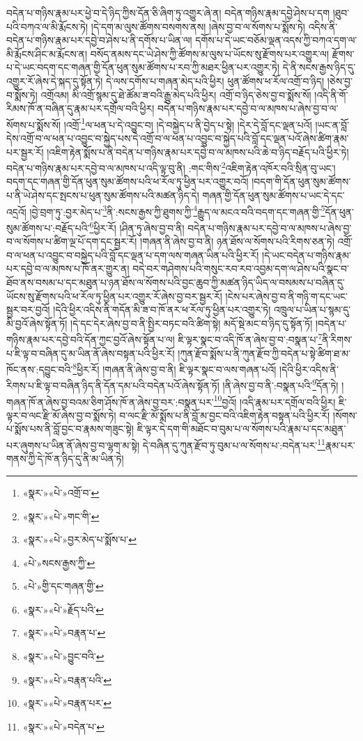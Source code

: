 བདེན་པ་གཉིས་རྣམ་པར་ཕྱེ་བ་དེ་ཉིད་ཀྱིས་དོན་ཅི་ཞིག་ཏུ་འགྱུར་ཞེ་ན། བདེན་གཉིས་རྣམ་དབྱེ་ཤེས་པ་དག །ཐུབ་པའི་བཀའ་ལ་མི་རྨོངས་ཏེ། །དེ་དག་མ་ལུས་ཚོགས་བསགས་ནས། །ཞེས་བྱ་བ་ལ་སོགས་པ་སྨོས་ཏེ། འདིས་ནི་བདེན་པ་གཉིས་རྣམ་པར་དབྱེ་བ་ཤེས་པ་ནི་དགོས་པ་ཡིན་ལ། དགོས་པ་དེ་ཡང་བཅོམ་ལྡན་འདས་ཀྱི་བཀའ་དག་ལ་མི་རྨོངས་ཤིང་མ་རྨོངས་ན། བསོད་ནམས་དང་ཡེ་ཤེས་ཀྱི་ཚོགས་མ་ལུས་པ་ཡོངས་སུ་རྫོགས་པར་འགྱུར་ལ། རྫོགས་པ་དེ་ཡང་བདག་དང་གཞན་གྱི་དོན་ཕུན་སུམ་ཚོགས་པ་རབ་ཀྱི་མཐར་ཕྱིན་པར་འགྱུར་ཏེ། དེ་ནི་སངས་རྒྱས་ཉིད་དུ་འགྱུར་རོ་ཞེས་དེ་སྐད་དུ་སྟོན་ཏེ། དེ་ལས་དགོས་པ་གཞན་མེད་པའི་ཕྱིར། ཕུན་ཚོགས་ཕ་རོལ་འགྲོ་བ་ཉིད། །ཅེས་བྱ་བ་སྨོས་ཏེ། འགྲོའམ། མི་འགྲོ་སྙམ་དུ་ཐེ་ཚོམ་ཟ་བའི་རྒྱུ་མེད་པའི་ཕྱིར། འགྲོ་བ་ཉིད་ཅེས་བྱ་བ་སྨོས་སོ། །འདི་ནི་གོ་རིམས་ཁོ་ན་བཞིན་དུ་རྣམ་པར་དགྲོལ་བའི་ཕྱིར། བདེན་པ་གཉིས་རྣམ་པར་དབྱེ་བ་ལ་མཁས་པ་ཞེས་བྱ་བ་ལ་སོགས་པ་སྨོས་སོ། །འགྲོ་\footnote{«སྣར་»«པེ་»འགྲོ་བ་}ལ་ཕན་པ་དེ་འབྱུང་བ། །དེ་བསྐྱེད་པ་ནི་བྱེད་པ་སྟེ། །དེར་དེ་བློ་དང་ལྡན་པའོ། །ཡང་ན་བློ་དེས་འགྲོ་བ་ལ་ཕན་པ་འབྱུང་བ་སྐྱེད་པས་དེ་འགྲོ་བ་ལ་ཕན་པ་འབྱུང་བ་སྐྱེད་པའི་བློ་དང་ལྡན་པའོ་ཞེས་ཚིག་རྣམ་པར་སྦྱར་རོ། །འཇིག་རྟེན་སྨོས་པ་ནི་བདེན་པ་གཉིས་རྣམ་པར་དབྱེ་བ་ལ་མཁས་པའི་ཆེ་བ་ཉིད་བརྗོད་པའི་ཕྱིར་ཏེ། བདེན་པ་གཉིས་རྣམ་པར་དབྱེ་བ་ལ་མཁས་པ་འདི་ལྟ་བུ་ནི། :གང་གིས་\footnote{«སྣར་»«པེ་»གང་གི་}འཇིག་རྟེན་འཁོར་བའི་སྲིན་བུ་ཡང་། བདག་དང་གཞན་གྱི་དོན་ཕུན་སུམ་ཚོགས་པའི་ཕ་རོལ་ཏུ་ཕྱིན་པར་འགྱུར་བའོ། །བདག་གི་དོན་ཕུན་སུམ་ཚོགས་པ་ནི་ཡེ་ཤེས་དང་སྤངས་པ་ཕུན་སུམ་ཚོགས་པའི་མཚན་ཉིད་དེ། གཞན་གྱི་དོན་ཕུན་སུམ་ཚོགས་པ་ཡང་དེ་དང་འདྲའོ། །བྱེ་བྲག་ཏུ་:བྱར་མེད་པ་\footnote{«སྣར་»«པེ་»བྱར་མེད་པ་སྨོས་པ་}ནི་:སངས་རྒྱས་ཀྱི་ཐུགས་ཀྱི་\footnote{«པེ་»སངས་རྒྱས་ཀྱི་}རྒྱུད་ལ་མངའ་བའི་བདག་དང་གཞན་གྱི་\footnote{«པེ་»གྱི་དང་གཞན་གྱི་}དོན་ཕུན་སུམ་ཚོགས་པ་:བརྗོད་པའི་\footnote{«སྣར་»«པེ་»རྗོད་པའི་}ཕྱིར་རོ། །ཤིན་ཏུ་ཞེས་བྱ་བ་ནི། བདེན་པ་གཉིས་རྣམ་པར་དབྱེ་བ་ལ་མཁས་པ་ཞེས་བྱ་བ་ལ་སོགས་པ་ཚིག་ལྔ་པོ་དག་དང་སྦྱར་རོ། །གཞན་ནི་ཞེས་བྱ་བ་ནི། ཉན་ཐོས་ལ་སོགས་པའི་རིགས་ཅན་ཏེ། འགྲོ་བ་ལ་ཕན་པ་འབྱུང་བ་བསྐྱེད་པའི་བློ་དང་ལྡན་པ་དག་ལས་གཞན་ཡིན་པའི་ཕྱིར་རོ། །དེ་ཡང་བདེན་པ་གཉིས་རྣམ་པར་དབྱེ་བ་ལ་མཁས་པ་ཁོ་ནར་གྱུར་ན། བདེ་བར་གཤེགས་པའི་གསུང་རབ་རབ་འབྱམ་དག་ལ་ཤེས་པའི་སྣང་བ་ཐོབ་ནས་བསམ་པ་དང་མཐུན་པ་ཉན་ཐོས་ལ་སོགས་པའི་བྱང་ཆུབ་ཀྱི་མཚན་ཉིད་ཡིད་ལ་བསམས་པ་བཞིན་དུ་ཡོངས་སུ་རྫོགས་པའི་ཕ་རོལ་ཏུ་ཕྱིན་པར་འགྱུར་རོ་ཞེས་བྱ་བར་སྦྱར་རོ། །ངེས་པར་ཞེས་བྱ་བ་ནི་གཉི་ག་དང་ཡང་སྦྱར་བར་བྱའོ། །དེའི་ཕྱིར་འདིས་ནི་གདོན་མི་ཟ་བ་ཁོ་ནར་ཕ་རོལ་ཏུ་ཕྱིན་པར་འགྱུར་ཏེ། འཁྲུལ་པ་ཡིན་པ་སྙམ་དུ་མི་བྱའོ་ཞེས་སྟོན་ཏོ། །དེ་དང་དེར་ཞེས་བྱ་བ་ནི་སྤྱིར་བཏང་བའི་ཚིག་སྟེ། མདོ་སྡེ་མང་བ་ཉིད་དུ་སྟོན་ཏོ། །བདེན་པ་གཉིས་རྣམ་པར་དབྱེ་བའི་དོན་ཀྱང་བྱའོ་ཞེས་སྟོན་པ་ལ། ཇི་ལྟར་སྣང་བ་འདི་ཁོ་ན་ཞེས་བྱ་བ་:བསྣན་པ་\footnote{«སྣར་»«པེ་»བརྣན་པ་}ནི་རིགས་པ་ཇི་ལྟ་བ་བཞིན་དུ་མ་ཡིན་ནོ་ཞེས་བསྟན་པའི་ཕྱིར་རོ། །ཀུན་རྫོབ་སྨོས་པ་ནི་ཀུན་རྫོབ་ཀྱི་བདེན་པ་སྟེ་ཚིག་ཐ་མ་ཁོང་ནས་:དབྱུང་བའི་\footnote{«སྣར་»«པེ་»བྱུང་བའི་}ཕྱིར་རོ། །གཞན་ནི་ཞེས་བྱ་བ་ནི། ཇི་ལྟར་སྣང་བ་ལས་གཞན་པའོ། །དེའི་ཕྱིར་འདིས་ནི་རིགས་པ་ཇི་ལྟ་བ་བཞིན་ཉིད་ནི་དོན་དམ་པའི་བདེན་པའོ་ཞེས་སྟོན་ཏོ། །ནི་ཞེས་བྱ་བ་ནི་:བསྣན་པའི་\footnote{«སྣར་»«པེ་»བརྣན་པའི་}དོན་ཏེ། །གཞན་ཁོ་ན་ཞེས་བྱ་བའམ་ཅིག་ཤོས་ཁོ་ན་ཞེས་བྱ་བར་:བསྣན་པར་\footnote{«སྣར་»«པེ་»བརྣན་པར་}བྱའོ། །འདི་རྣམ་པར་དགྲོལ་བའི་ཕྱིར། ཇི་ལྟར་བ་ལང་རྫི་མོ་ཞེས་བྱ་བ་སྨོས་ཏེ། བ་ལང་རྫི་མོ་སྨོས་པ་ནི་བློ་མ་བྱང་བའི་འཇིག་རྟེན་བསྟན་པའི་ཕྱིར་རོ། །སོགས་པ་སྨོས་པས་ནི་བློ་བྱང་བ་རྣམས་གཟུང་སྟེ། ཇི་ལྟར་དེ་དག་གི་མཐོང་བ་བུམ་པ་ལ་སོགས་པའི་རྣམ་པ་དང་མཐུན་པར་ཞུགས་པ་ཡིན་ནོ་ཞེས་བྱ་བ་ལྷག་མ་སྟེ། དེ་བཞིན་དུ་ཀུན་རྫོབ་ཏུ་བུམ་པ་ལ་སོགས་པ་:བདེན་པར་\footnote{«སྣར་»«པེ་»བདེན་པ་}རྣམ་པར་གནས་ཀྱི་དེ་ཁོ་ན་ཉིད་དུ་ནི་མ་ཡིན་ཏེ། 